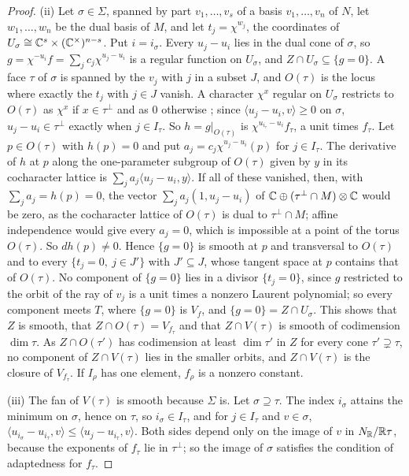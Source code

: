 \begin{proof}
(ii) Let $\sigma\in\Sigma$, spanned by part $v_{1},\dots,v_{s}$ of a basis
$v_{1},\dots,v_{n}$ of $N$, let $w_{1},\dots,w_{n}$ be the dual basis of $M$,
and let $t_{j}=\chi^{w_{j}}$, the coordinates of
$U_{\sigma}\cong\mathbb{C}^{s}\times(\mathbb{C}^{\times})^{n-s}$. Put $i=i_{\sigma}$. Every
$u_{j}-u_{i}$ lies in the dual cone of $\sigma$, so
$g=\chi^{-u_{i}}f=\sum_{j}c_{j}\chi^{u_{j}-u_{i}}$ is a regular function on
$U_{\sigma}$, and $Z\cap U_{\sigma}\subseteq\{g=0\}$. A face $\tau$ of
$\sigma$ is spanned by the $v_{j}$ with $j$ in a subset $J$, and $O(\tau)$ is
the locus where exactly the $t_{j}$ with $j\in J$ vanish. A character
$\chi^{x}$ regular on $U_{\sigma}$ restricts to $O(\tau)$ as $\chi^{x}$ if
$x\in\tau^{\perp}$ and as $0$ otherwise \cite[Chapter~3]{CLS11}; since
$\langle u_{j}-u_{i},v\rangle\ge0$ on $\sigma$, $u_{j}-u_{i}\in\tau^{\perp}$
exactly when $j\in I_{\tau}$. So $h=g|_{O(\tau)}$ is
$\chi^{u_{i_{\tau}}-u_{i}}f_{\tau}$, a unit times $f_{\tau}$. Let $p\in
O(\tau)$ with $h(p)=0$ and put $a_{j}=c_{j}\chi^{u_{j}-u_{i}}(p)$ for $j\in
I_{\tau}$. The derivative of $h$ at $p$ along the one-parameter subgroup of
$O(\tau)$ given by $y$ in its cocharacter lattice is $\sum_{j}a_{j}\langle
u_{j}-u_{i},y\rangle$. If all of these vanished, then, with
$\sum_{j}a_{j}=h(p)=0$, the vector $\sum_{j}a_{j}(1,u_{j}-u_{i})$ of
$\mathbb{C}\oplus(\tau^{\perp}\cap M)\otimes\mathbb{C}$ would be zero, as the cocharacter
lattice of $O(\tau)$ is dual to $\tau^{\perp}\cap M$; affine independence
would give every $a_{j}=0$, which is impossible at a point of the torus
$O(\tau)$. So $dh(p)\ne0$. Hence $\{g=0\}$ is smooth at $p$ and transversal
to $O(\tau)$ and to every $\{t_{j}=0,\ j\in J'\}$ with $J'\subseteq J$, whose
tangent space at $p$ contains that of $O(\tau)$. No component of $\{g=0\}$
lies in a divisor $\{t_{j}=0\}$, since $g$ restricted to the orbit of the
ray of $v_{j}$ is a unit times a nonzero Laurent polynomial; so every
component meets $T$, where $\{g=0\}$ is $V_{f}$, and
$\{g=0\}=Z\cap U_{\sigma}$. This shows that $Z$ is smooth, that
$Z\cap O(\tau)=V_{f_{\tau}}$ and that $Z\cap V(\tau)$ is smooth of
codimension $\dim\tau$. As $Z\cap O(\tau')$ has codimension at least
$\dim\tau'$ in $Z$ for every cone $\tau'\supsetneq\tau$, no component of
$Z\cap V(\tau)$ lies in the smaller orbits, and $Z\cap V(\tau)$ is the
closure of $V_{f_{\tau}}$. If $I_{\rho}$ has one element, $f_{\rho}$ is a
nonzero constant.

(iii) The fan of $V(\tau)$ is smooth because $\Sigma$ is. Let $\sigma\supseteq
\tau$. The index $i_{\sigma}$ attains the minimum on $\sigma$, hence on
$\tau$, so $i_{\sigma}\in I_{\tau}$, and for $j\in I_{\tau}$ and $v\in\sigma$,
$\langle u_{i_{\sigma}}-u_{i_{\tau}},v\rangle\le\langle
u_{j}-u_{i_{\tau}},v\rangle$. Both sides depend only on the image of $v$ in
$N_{\mathbb{R}}/\mathbb{R}\tau$, because the exponents of $f_{\tau}$ lie in $\tau^{\perp}$;
so the image of $\sigma$ satisfies the condition of adaptedness for
$f_{\tau}$.
\end{proof}

